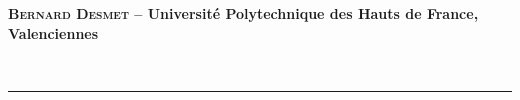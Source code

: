 \hspace{0.04\linewidth}\vrule\hspace{0.01\linewidth}\parbox{0.9\linewidth}{
\textbf{{\scshape Bernard Desmet} -- Université Polytechnique des Hauts de France, Valenciennes}}\\[2ex]

\vspace{1cm}
\hrule


%
